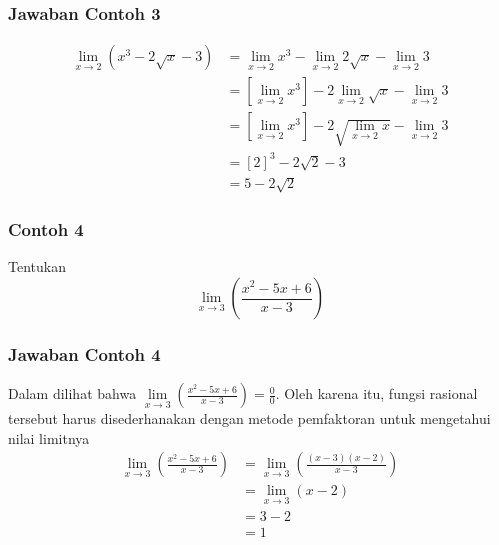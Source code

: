 \documentclass[pdflatex,compress,mathserif]{beamer}
\begin{document}
		\begin{frame}
			\frametitle{Jawaban Contoh 3}
			\begin{align*}
				\lim\limits_{x \rightarrow 2} \left( x^3 - 2\sqrt{x} - 3 \right) & = \lim\limits_{x \rightarrow 2} x^3 - \lim\limits_{x \rightarrow 2} 2\sqrt{x} - \lim\limits_{x \rightarrow 2} 3 \\
				& = \left[\lim\limits_{x \rightarrow 2} x^3\right] - 2\lim\limits_{x \rightarrow 2} \sqrt{x} - \lim\limits_{x \rightarrow 2} 3 \\
				& = \left[\lim\limits_{x \rightarrow 2} x^3\right] - 2\sqrt{\lim\limits_{x \rightarrow 2} x} - \lim\limits_{x \rightarrow 2} 3 \\
				& = [2]^3 - 2\sqrt{2} - 3 \\
				& = 5 - 2\sqrt{2}
			\end{align*}
		\end{frame}
	
		\begin{frame}
			\frametitle{Contoh 4}
			Tentukan
			\begin{equation*}
				\lim\limits_{x \rightarrow 3} \left( \frac{x^2 - 5x + 6}{x - 3} \right)
			\end{equation*}
		\end{frame}
	
		\begin{frame}
			\frametitle{Jawaban Contoh 4}
			Dalam dilihat bahwa $ \lim\limits_{x \rightarrow 3} \left( \frac{x^2 - 5x + 6}{x - 3} \right) = \frac{0}{0} $. Oleh karena itu, fungsi rasional tersebut harus disederhanakan dengan metode pemfaktoran untuk mengetahui nilai limitnya
			\begin{align*}
				\lim\limits_{x \rightarrow 3} \left( \frac{x^2 - 5x + 6}{x - 3} \right) &= \lim\limits_{x \rightarrow 3} \left( \frac{(x-3)(x-2)}{x - 3} \right) \\
				&= \lim\limits_{x \rightarrow 3} \left( x-2\right) \\
				&= 3 - 2 \\
				&= 1
			\end{align*}
		\end{frame}
\end{document}
